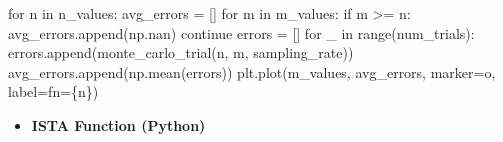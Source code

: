 \documentclass[
  letterpaper,
  DIV=11,
  numbers=noendperiod]{scrartcl}
\newenvironment{Shaded}{\begin{snugshade}}{\end{snugshade}}
\newcommand{\BuiltInTok}[1]{\textcolor[rgb]{0.40,0.85,0.94}{#1}}
\newcommand{\ControlFlowTok}[1]{\textcolor[rgb]{0.98,0.15,0.45}{#1}}
\newcommand{\KeywordTok}[1]{\textcolor[rgb]{0.98,0.15,0.45}{#1}}
\newcommand{\NormalTok}[1]{\textcolor[rgb]{0.97,0.97,0.95}{#1}}
\newcommand{\OperatorTok}[1]{\textcolor[rgb]{0.97,0.97,0.95}{#1}}
\newcommand{\SpecialCharTok}[1]{\textcolor[rgb]{0.68,0.51,1.00}{#1}}
\newcommand{\SpecialStringTok}[1]{\textcolor[rgb]{0.90,0.86,0.45}{#1}}
\newcommand{\StringTok}[1]{\textcolor[rgb]{0.90,0.86,0.45}{#1}}
\providecommand{\tightlist}{%
  \setlength{\itemsep}{0pt}\setlength{\parskip}{0pt}}
\begin{document}
\begin{Shaded}
\begin{Highlighting}[]
\ControlFlowTok{for}\NormalTok{ n }\KeywordTok{in}\NormalTok{ n\_values:}
\NormalTok{    avg\_errors }\OperatorTok{=}\NormalTok{ []}
    \ControlFlowTok{for}\NormalTok{ m }\KeywordTok{in}\NormalTok{ m\_values:}
        \ControlFlowTok{if}\NormalTok{ m }\OperatorTok{\textgreater{}=}\NormalTok{ n:}
\NormalTok{            avg\_errors.append(np.nan)}
            \ControlFlowTok{continue}
\NormalTok{        errors }\OperatorTok{=}\NormalTok{ []}
        \ControlFlowTok{for}\NormalTok{ \_ }\KeywordTok{in} \BuiltInTok{range}\NormalTok{(num\_trials):}
\NormalTok{            errors.append(monte\_carlo\_trial(n, m, sampling\_rate))}
\NormalTok{        avg\_errors.append(np.mean(errors))}
\NormalTok{    plt.plot(m\_values, avg\_errors, marker}\OperatorTok{=}\StringTok{\textquotesingle{}o\textquotesingle{}}\NormalTok{, label}\OperatorTok{=}\SpecialStringTok{f\textquotesingle{}n=}\SpecialCharTok{\{}\NormalTok{n}\SpecialCharTok{\}}\SpecialStringTok{\textquotesingle{}}\NormalTok{)}
\end{Highlighting}
\end{Shaded}

\begin{itemize}
\tightlist
\item
  \textbf{ISTA Function (Python)}
\end{itemize}
\end{document}
